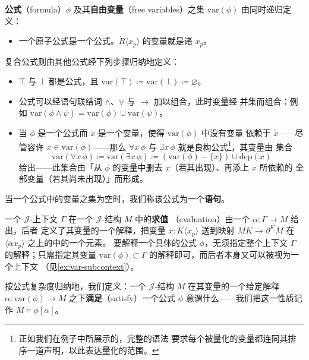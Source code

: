 \begin{definition}\label{def:formulae}
\textbf{公式}（formula）$\phi$ 及其\textbf{自由变量}（free variables）之集
$\mathrm{var}(\phi)$ 由同时递归定义：
\begin{itemize}
\item 一个原子公式是一个公式。$\dot{R}\langle x_{p}\rangle$ 的变量就是诸 $x_{p}$。
\end{itemize}
复合公式则由其他公式经下列步骤归纳地定义：
\begin{itemize}
\item $\top$ 与 $\bot$ 都是公式，且
  $\mathrm{var}(\top)\coloneqq\mathrm{var}(\bot)\coloneqq\varnothing$。
\item 公式可以经语句联结词 $\wedge$、$\vee$ 与 $\rightarrow$ 加以组合，此时变量经
  并集而组合：例如 $\mathrm{var}(\phi\wedge\psi)=\mathrm{var}(\phi)\cup\mathrm{var}(\psi)$。
\item 当 $\phi$ 是一个公式而 $x$ 是一个变量，使得 $\mathrm{var}(\phi)$ 中没有变量
  依赖于 $x$——尽管容许 $x\in\mathrm{var}(\phi)$——那么 $\forall x\,\phi$ 与
  $\exists x\,\phi$ 就是良构公式\footnote{正如我们在例子中所展示的，完整的语法
  要求每个被量化的变量都连同其排序一道声明，以此表达量化的范围。}，其变量由
  集合
\begin{equation*}
\mathrm{var}(\forall x\,\phi)\coloneqq\mathrm{var}(\exists x\,\phi)\coloneqq
(\mathrm{var}(\phi)-\{x\})\cup\mathrm{dep}(x)
\end{equation*}
  给出——此集合由「从 $\phi$ 的变量中删去 $x$（若其出现）、再添上 $x$ 所依赖的
  全部变量（若其尚未出现）」而形成。
\end{itemize}
当一个公式中的变量之集为空时，我们称该公式为一个\textbf{语句}。
\end{definition}

一个 $\mathcal{J}$-上下文 $\Gamma$ 在一个 $\mathcal{J}$-结构 $M$ 中的\textbf{求值}
（evaluation）由一个\trNaturalTransformation{} $\alpha\colon\Gamma\to M$ 给出，后者
定义了其变量的一个解释，把变量 $x:K\langle x_{p}\rangle$ 送到映射
$MK\to\partial^{K}M$ 在 $\langle\alpha x_{p}\rangle$ 之上的\trFiber{}中的一个元素。
要解释一个具体的公式 $\phi$，无须指定整个上下文 $\Gamma$ 的解释；只需指定其变量
$\mathrm{var}(\phi)\subset\Gamma$ 的解释即可，而后者本身又可以被视为一个上下文
（见\cref{ex:var-subcontext}）。

按公式复杂度归纳地，我们定义：一个 $\mathcal{J}$-结构 $M$ 在其变量的一个给定解释
$\alpha\colon\mathrm{var}(\phi)\to M$ 之下\textbf{满足}（satisfy）一个公式 $\phi$
意谓什么——我们把这一性质记作 $M\models\phi[\alpha]$。

